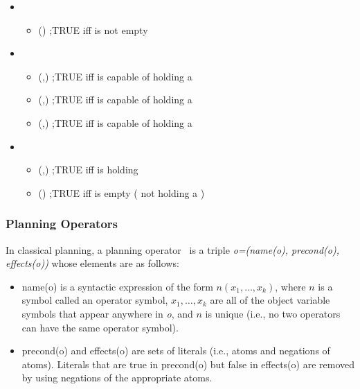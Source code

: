 \begin{itemize}
 \item {}
  \begin{itemize}
    \item {}() ;TRUE iff  is not empty
  \end{itemize}

 \item {}
  \begin{itemize}
    \item {}(,) ;TRUE iff  is capable of holding a 	 
    \item {}(,) ;TRUE iff  is capable of holding a 
    \item {}(,) ;TRUE iff  is capable of holding a 
  \end{itemize}

 \item {}
  \begin{itemize}
    \item {}(,) ;TRUE iff  is holding 
    \item {}() ;TRUE iff  is empty ( not holding a )
  \end{itemize}
\end{itemize}


\subsubsection{Planning Operators}
 In classical planning, a planning operator~\cite{NAU.2004} is a triple \textit{o=(name(o), precond(o), effects(o))} whose elements are as follows:
\begin{itemize}
\item name(o) is a syntactic expression of the form $n(x_1,\dots,x_k)$, where $n$ is a symbol
called an operator symbol, $x_1,\dots,x_k$ are all of the object variable symbols that
appear anywhere in \textit{o}, and $n$ is unique (i.e., no two operators can have the
same operator symbol).
\item precond(o) and effects(o) are sets of literals (i.e., atoms and negations of atoms). Literals that are true in precond(o) but false in effects(o) are removed by using negations of the appropriate atoms.
\end{itemize}

